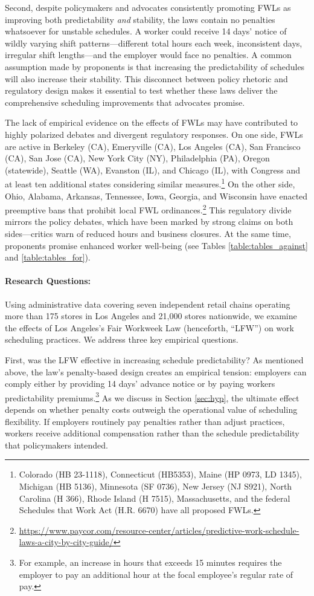\documentclass[letterpaper,11pt,leqno]{article}
\theoremstyle{paper}
\begin{document}
Second, despite policymakers and advocates consistently promoting FWLs as improving both predictability \textit{and} stability, the laws contain no penalties whatsoever for unstable schedules. A worker could receive 14 days' notice of wildly varying shift patterns—different total hours each week, inconsistent days, irregular shift lengths—and the employer would face no penalties. A common assumption made by proponents is that increasing the predictability of schedules will also increase their stability. This disconnect between policy rhetoric and regulatory design makes it essential to test whether these laws deliver the comprehensive scheduling improvements that advocates promise.

The lack of empirical evidence on the effects of FWLs may have contributed to highly polarized debates and divergent regulatory responses. On one side, FWLs are active in Berkeley (CA), Emeryville (CA), Los Angeles (CA), San Francisco (CA), San Jose (CA), New York City (NY), Philadelphia (PA), Oregon (statewide), Seattle (WA), Evanston (IL), and Chicago (IL), with Congress and at least ten additional states considering similar measures.\footnote{Colorado (HB 23-1118), Connecticut (HB5353), Maine (HP 0973, LD 1345), Michigan (HB 5136), Minnesota (SF 0736), New Jersey (NJ S921), North Carolina (H 366), Rhode Island (H 7515), Massachusetts, and the federal Schedules that Work Act (H.R. 6670) have all proposed FWLs.} On the other side, Ohio, Alabama, Arkansas, Tennessee, Iowa, Georgia, and Wisconsin have enacted preemptive bans that prohibit local FWL ordinances.\footnote{\url{https://www.paycor.com/resource-center/articles/predictive-work-schedule-laws-a-city-by-city-guide/}} This regulatory divide mirrors the policy debates, which have been marked by strong claims on both sides—critics warn of reduced hours and business closures. At the same time, proponents promise enhanced worker well-being (see Tables \ref{table:tables_against} and \ref{table:tables_for}).

\paragraph{Research Questions:}
Using administrative data covering seven independent retail chains operating more than 175 stores in Los Angeles and 21,000 stores nationwide, we examine the effects of Los Angeles's Fair Workweek Law (henceforth, ``LFW'') on work scheduling practices. We address three key empirical questions.  

First, was the LFW effective in increasing schedule predictability? As mentioned above, the law's penalty-based design creates an empirical tension: employers can comply either by providing 14 days' advance notice or by paying workers predictability premiums.\footnote{For example, an increase in hours that exceeds 15 minutes requires the employer to pay an additional hour at the focal employee’s regular rate of pay.} As we discuss in Section \ref{sec:hyp}, the ultimate effect depends on whether penalty costs outweigh the operational value of scheduling flexibility. If employers routinely pay penalties rather than adjust practices, workers receive additional compensation rather than the schedule predictability that policymakers intended.
\end{document}

